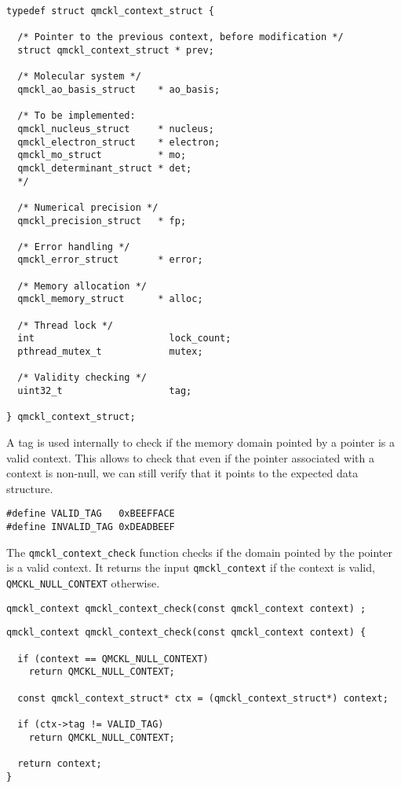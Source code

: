 \begin{verbatim}
typedef struct qmckl_context_struct {

  /* Pointer to the previous context, before modification */
  struct qmckl_context_struct * prev;

  /* Molecular system */
  qmckl_ao_basis_struct    * ao_basis;

  /* To be implemented:
  qmckl_nucleus_struct     * nucleus;
  qmckl_electron_struct    * electron;
  qmckl_mo_struct          * mo;
  qmckl_determinant_struct * det;
  */

  /* Numerical precision */
  qmckl_precision_struct   * fp;

  /* Error handling */
  qmckl_error_struct       * error;

  /* Memory allocation */
  qmckl_memory_struct      * alloc;

  /* Thread lock */
  int                        lock_count;
  pthread_mutex_t            mutex;

  /* Validity checking */
  uint32_t                   tag;

} qmckl_context_struct;
\end{verbatim}


A tag is used internally to check if the memory domain pointed
by a pointer is a valid context. This allows to check that even if
the pointer associated with a context is non-null, we can still
verify that it points to the expected data structure.

\begin{verbatim}
#define VALID_TAG   0xBEEFFACE
#define INVALID_TAG 0xDEADBEEF
\end{verbatim}

The \texttt{qmckl\_context\_check} function checks if the domain pointed by
the pointer is a valid context. It returns the input \texttt{qmckl\_context}
if the context is valid, \texttt{QMCKL\_NULL\_CONTEXT} otherwise.

\begin{verbatim}
qmckl_context qmckl_context_check(const qmckl_context context) ;
\end{verbatim}

\begin{verbatim}
qmckl_context qmckl_context_check(const qmckl_context context) {

  if (context == QMCKL_NULL_CONTEXT)
    return QMCKL_NULL_CONTEXT;

  const qmckl_context_struct* ctx = (qmckl_context_struct*) context;

  if (ctx->tag != VALID_TAG)
    return QMCKL_NULL_CONTEXT;

  return context;
}
\end{verbatim}

